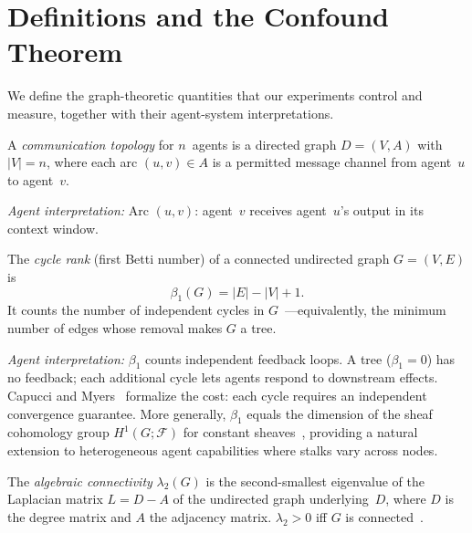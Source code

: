\documentclass[runningheads]{llncs}
\begin{document}
\section{Definitions and the Confound Theorem}
\label{sec:definitions}

We define the graph-theoretic quantities that our experiments control
and measure, together with their agent-system interpretations.

\begin{definition}
\label{def:topology}
A \emph{communication topology} for $n$~agents is a directed graph
$D = (V, A)$ with $|V| = n$, where each arc $(u, v) \in A$ is a
permitted message channel from agent~$u$ to agent~$v$.
\end{definition}

\noindent
\textit{Agent interpretation:} Arc $(u, v)$: agent~$v$ receives
agent~$u$'s output in its context window.

\begin{definition}
\label{def:cyclerank}
The \emph{cycle rank} (first Betti number) of a connected undirected
graph $G = (V, E)$ is
\begin{equation}
  \beta_1(G) = |E| - |V| + 1.
\end{equation}
It counts the number of independent cycles in
$G$~\cite{hatcher2002algebraic}---equivalently, the minimum number of
edges whose removal makes $G$ a tree.
\end{definition}

\noindent
\textit{Agent interpretation:} $\beta_1$ counts independent feedback
loops. A tree ($\beta_1 = 0$) has no feedback; each additional cycle
lets agents respond to downstream effects. Capucci and
Myers~\cite{capucci2026feedback} formalize the cost: each cycle
requires an independent convergence guarantee.
More generally, $\beta_1$ equals the dimension of the sheaf cohomology group $H^1(G;\mathcal{F})$ for constant sheaves~\cite{hanks2025cellular}, providing a natural extension to heterogeneous agent capabilities where stalks vary across nodes.

\begin{definition}
\label{def:lambda2}
The \emph{algebraic connectivity} $\lambda_2(G)$ is the second-smallest
eigenvalue of the Laplacian matrix $L = D - A$ of the undirected
graph underlying~$D$, where $D$ is the degree matrix and $A$ the
adjacency matrix. $\lambda_2 > 0$ iff $G$ is
connected~\cite{fiedler1973algebraic}.
\end{definition}
\end{document}
